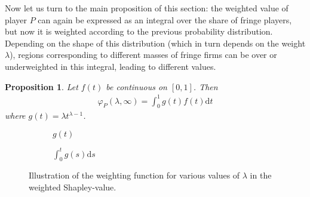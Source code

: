 \documentclass[a4paper]{article}
\newtheorem{proposition}{Proposition}
\newcommand{\dt}{\mathrm{d}t}
\newcommand{\ds}{\mathrm{d}s}
\begin{document}
Now let us turn to the main proposition of this section: the weighted value of player $P$ can again be expressed as an integral over the share of fringe players, but now it is weighted according to the previous probability distribution.
Depending on the shape of this distribution (which in turn depends on the weight $\lambda$), regions corresponding to different masses of fringe firms can be over or underweighted in this integral, leading to different values.
\begin{proposition}
    \label{prop:one_sided_weighted}
    Let $f(t)$ be continuous on $[0, 1]$. Then
    \begin{align*}
        \varphi_P(\lambda, \infty) = \int_0^1 g(t) f(t) \dt
    \end{align*}
    where $g(t) = \lambda t^{\lambda - 1}$.
\end{proposition}

\begin{figure}[ht]
    \centering
    \begin{subfigure}[b]{0.45\textwidth}
        \centering
        \caption{$g(t)$}
    \end{subfigure}
    \begin{subfigure}[b]{0.45\textwidth}
        \centering
        \caption{$\int_0^t g(s) \ds$}
    \end{subfigure}
    \caption{Illustration of the weighting function for various values of $\lambda$ in the weighted Shapley-value.}
    \label{fig:weigh_function}
\end{figure}
\end{document}
